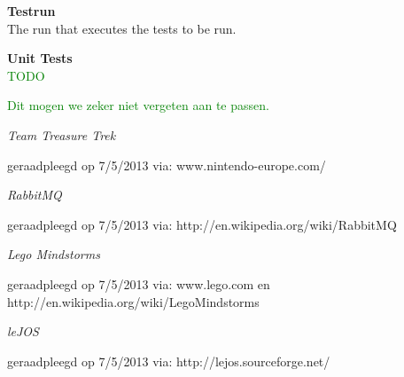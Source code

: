 \documentclass[i2]{oss}
\newcommand{\gloss}[1]{\textbf{#1}}
\newcommand{\comment}[1]{{\huge \textcolor{green}{#1}}\\}
\begin{document}
\begin{description}
\item \gloss{Testrun} \\ 
	The run that executes the tests to be run.


\item \gloss{Unit Tests} \\
\comment{TODO}

 
\end{description}

\newpage
\comment{Dit mogen we zeker niet vergeten aan te passen.}
\begin{flushleft}
\begin{thebibliography}{9}

\textit{Team Treasure Trek}
\begin{scriptsize}
geraadpleegd op 7/5/2013 via: \mbox{www.nintendo-europe.com/}
\end{scriptsize}

\textit{RabbitMQ}
\begin{scriptsize}
geraadpleegd op 7/5/2013 via: \mbox{http://en.wikipedia.org/wiki/RabbitMQ}
\end{scriptsize}

\textit{Lego Mindstorms}
\begin{scriptsize}
geraadpleegd op 7/5/2013 via: \mbox{www.lego.com} en \mbox{http://en.wikipedia.org/wiki/Lego\textendash Mindstorms}
\end{scriptsize}

\textit{leJOS}
\begin{scriptsize}
geraadpleegd op 7/5/2013 via: \mbox{http://lejos.sourceforge.net/}
\end{scriptsize}


\end{thebibliography}
\end{flushleft}

 
\end{document}
